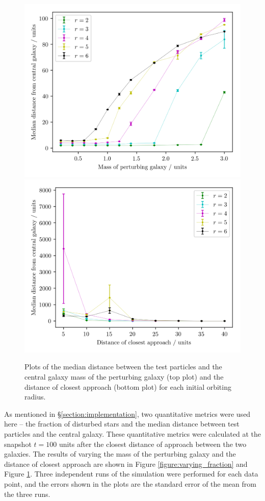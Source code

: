 \documentclass[twoside,twocolumn]{article}
\begin{document}
        \begin{figure}
            \centering
            \includegraphics[width=\linewidth]{images/plot_distance_mass.png}
            \includegraphics[width=\linewidth]{images/plot_distance_rmin.png}
            \caption{Plots of the median distance between the test particles and the central galaxy mass of the perturbing galaxy (top plot) and the distance of closest approach (bottom plot) for each initial orbiting radius.}
            \label{figure:varying_distance}
        \end{figure}

        As mentioned in \S \ref{section:implementation}, two quantitative metrics were used here -- the fraction of disturbed stars and the median distance between test particles and the central galaxy. These quantitative metrics were calculated at the snapshot $t = 100$ units after the closest distance of approach between the two galaxies. The results of varying the mass of the perturbing galaxy and the distance of closest approach are shown in Figure \ref{figure:varying_fraction} and Figure \ref{figure:varying_distance}. Three independent runs of the simulation were performed for each data point, and the errors shown in the plots are the standard error of the mean from the three runs. 
        
\end{document}
